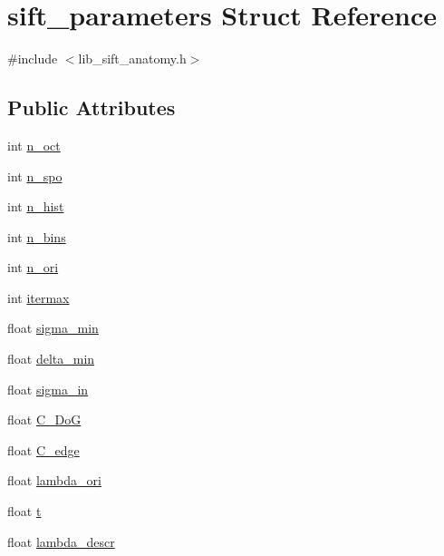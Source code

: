 \hypertarget{structsift__parameters}{}\section{sift\+\_\+parameters Struct Reference}
\label{structsift__parameters}


{\ttfamily \#include $<$lib\+\_\+sift\+\_\+anatomy.\+h$>$}

\subsection*{Public Attributes}
\begin{DoxyCompactItemize}
\item 
int \hyperlink{structsift__parameters_a9db1ed18c6d487a6835e7b943d179a5e}{n\+\_\+oct}
\item 
int \hyperlink{structsift__parameters_acdf15d1e0ac14b02537e80ab7d045d7b}{n\+\_\+spo}
\item 
int \hyperlink{structsift__parameters_a51a030f838687569219282e598e31511}{n\+\_\+hist}
\item 
int \hyperlink{structsift__parameters_a0d3133aa05a22dcf904ce2968ec7bff9}{n\+\_\+bins}
\item 
int \hyperlink{structsift__parameters_afdeeea3884a93c53734b656fcca9d55d}{n\+\_\+ori}
\item 
int \hyperlink{structsift__parameters_a768e4b194ef5af03531a43cbd6d41f16}{itermax}
\item 
float \hyperlink{structsift__parameters_a3ae4e767d5e8956fe4c9ddd2a01bcc19}{sigma\+\_\+min}
\item 
float \hyperlink{structsift__parameters_a6fb566e0e7b6cb4313c2662b2f398e79}{delta\+\_\+min}
\item 
float \hyperlink{structsift__parameters_ac9e701f1bd3fa03ef219da6eb794646e}{sigma\+\_\+in}
\item 
float \hyperlink{structsift__parameters_a4dab07c42aedf4025e34ae8b8f23bb32}{C\+\_\+\+Do\+G}
\item 
float \hyperlink{structsift__parameters_a48e97ef3e8e6f19e5e8847fdf0fad0dd}{C\+\_\+edge}
\item 
float \hyperlink{structsift__parameters_a58c6079221fe2f3bcf0e5e44317ef371}{lambda\+\_\+ori}
\item 
float \hyperlink{structsift__parameters_ac3e56b708dcd6829cb3448491e44c7e5}{t}
\item 
float \hyperlink{structsift__parameters_ab1d878bceeb6978a0c678eaf8960240d}{lambda\+\_\+descr}
\end{DoxyCompactItemize}


